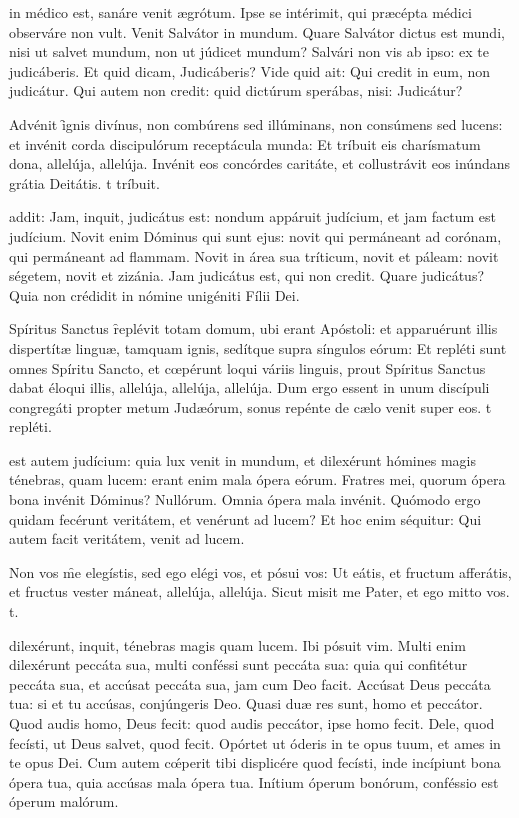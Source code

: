 \documentclass[fontsize=9pt,paper=A6,twoside,BCOR=1mm,DIV=22,headinclude]{scrarticle}
\begin{document}
\begin{multicols}{2}
 in médico est, sanáre venit ægrótum. Ipse se intérimit, qui præcépta médici observáre non vult. Venit Salvátor in mundum. Quare Salvátor dictus est mundi, nisi ut salvet mundum, non ut júdicet mundum? Salvári non vis ab ipso: ex te judicáberis. Et quid dicam, Judicáberis? Vide quid ait: Qui credit in eum, non judicátur. Qui autem non credit: quid dictúrum sperábas, nisi: Judicátur?

\R Advénit \f ignis divínus, non combúrens sed illúminans, non consúmens sed lucens: et invénit corda discipulórum receptácula munda:
\red{*} Et tríbuit eis charísmatum dona, allelúja, allelúja.
\V Invénit eos concórdes caritáte, et collustrávit eos inúndans grátia Deitátis.
t tríbuit.

 addit: Jam, inquit, judicátus est: nondum appáruit judícium, et jam factum est judícium. Novit enim Dóminus qui sunt ejus: novit qui permáneant ad corónam, qui permáneant ad flammam. Novit in área sua tríticum, novit et páleam: novit ségetem, novit et zizánia. Jam judicátus est, qui non credit. Quare judicátus? Quia non crédidit in nómine unigéniti Fílii Dei.

\R Spíritus Sanctus \f replévit totam domum, ubi erant Apóstoli: et apparuérunt illis dispertítæ linguæ, tamquam ignis, sedítque supra síngulos eórum:
\red{*} Et repléti sunt omnes Spíritu Sancto, et cœpérunt loqui váriis linguis, prout Spíritus Sanctus dabat éloqui illis, allelúja, allelúja, allelúja.
\V Dum ergo essent in unum discípuli congregáti propter metum Judæórum, sonus repénte de cælo venit super eos.
t repléti.

 est autem judícium: quia lux venit in mundum, et dilexérunt hómines magis ténebras, quam lucem: erant enim mala ópera eórum. Fratres mei, quorum ópera bona invénit Dóminus? Nullórum. Omnia ópera mala invénit. Quómodo ergo quidam fecérunt veritátem, et venérunt ad lucem? Et hoc enim séquitur: Qui autem facit veritátem, venit ad lucem.

\R Non vos \f me elegístis, sed ego elégi vos, et pósui vos:
\red{*} Ut eátis, et fructum afferátis, et fructus vester máneat, allelúja, allelúja.
\V Sicut misit me Pater, et ego mitto vos.
t.

 dilexérunt, inquit, ténebras magis quam lucem. Ibi pósuit vim. Multi enim dilexérunt peccáta sua, multi conféssi sunt peccáta sua: quia qui confitétur peccáta sua, et accúsat peccáta sua, jam cum Deo facit. Accúsat Deus peccáta tua: si et tu accúsas, conjúngeris Deo. Quasi duæ res sunt, homo et peccátor. Quod audis homo, Deus fecit: quod audis peccátor, ipse homo fecit. Dele, quod fecísti, ut Deus salvet, quod fecit. Opórtet ut óderis in te opus tuum, et ames in te opus Dei. Cum autem cœ́perit tibi displicére quod fecísti, inde incípiunt bona ópera tua, quia accúsas mala ópera tua. Inítium óperum bonórum, conféssio est óperum malórum.


\end{multicols}
\end{document}

